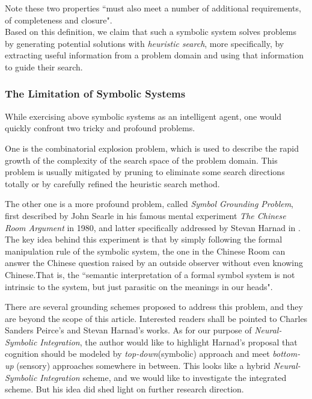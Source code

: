 \documentclass[letterpaper,10pt]{article}
\theoremstyle{definition}
\begin{document}
\noindent Note these two properties ``must also meet a number of additional requirements, of completeness and closure"\cite{newell1976computer}.\\

Based on this definition, we claim that such a symbolic system solves problems by generating potential solutions with \emph{heuristic search}, more specifically, by extracting useful information from a problem domain and using that information to guide their search.


\subsubsection{The Limitation of Symbolic Systems}\label{ss_limits}

While exercising above symbolic systems as an intelligent agent, one would quickly confront two tricky and profound problems.

One is the combinatorial explosion problem, which is used to describe the rapid growth of the complexity of the search space of the problem domain. This problem is usually mitigated by pruning to eliminate some search directions totally or by carefully refined the heuristic search method.

The other one is a more profound problem, called \emph{Symbol Grounding Problem}, first described by John Searle in his famous mental experiment \emph{The Chinese Room Argument} in 1980\cite{searle1980minds}, and latter specifically addressed by Stevan Harnad in \cite{harnad1990symbol}. The key idea behind this experiment is that by simply following the formal manipulation rule of the symbolic system, the one in the Chinese Room can answer the Chinese question raised by an outside observer without even knowing Chinese.That is, the ``semantic interpretation of a formal symbol system is not intrinsic to the system, but just parasitic on the meanings in our heads"\cite{harnad1990symbol}.

There are several grounding schemes proposed to address this problem, and they
are beyond the scope of this article. Interested readers shall be pointed to
Charles Sanders Peirce's and Stevan Harnad's works. As for our purpose of \emph{Neural-Symbolic Integration}, the author would like to highlight Harnad's proposal that cognition
should be modeled by \emph{top-down}(symbolic) approach and meet \emph{bottom-up} (sensory)
approaches somewhere in between\cite{harnad1990symbol}. This looks like a hybrid 
\emph{Neural-Symbolic Integration} scheme, and we would like to investigate the
integrated scheme. But his idea did shed light on further research direction.
\end{document}
